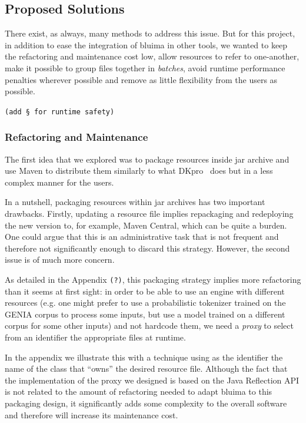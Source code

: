 \documentclass{article}
\newcommand{\TODO}[1]{\texttt{\textcolor{YellowOrange}{(#1)}}} %
\begin{document}
\subsection{Proposed Solutions}

There exist, as always, many methods to address this issue. But for this project, in addition to
ease the integration of bluima in other tools, we wanted to keep the refactoring and maintenance
cost low, allow resources to refer to one-another, make it possible to group files together in
\emph{batches}, avoid runtime performance penalties wherever possible and remove as little
flexibility from the users as possible.

\TODO{add § for runtime safety}

\subsubsection{Refactoring and Maintenance}

The first idea that we explored was to package resources inside jar archive and use Maven to
distribute them similarly to what DKpro~\cite{dkpro} does but in a less complex manner for the
users.

In a nutshell, packaging resources within jar archives has two important drawbacks. Firstly,
updating a resource file implies repackaging and redeploying the new version to, for example, Maven
Central, which can be quite a burden. One could argue that this is an administrative task that is
not frequent and therefore not significantly enough to discard this strategy. However, the second
issue is of much more concern.

As detailed in the Appendix \TODO{?}, this packaging strategy implies more refactoring than it seems
at first sight: in order to be able to use an engine with different resources (e.g. one might prefer
to use a probabilistic tokenizer trained on the GENIA corpus to process some inputs, but use a model
trained on a different corpus for some other inputs) and not hardcode them, we need a \emph{proxy}
to select from an identifier the appropriate files at runtime.

In the appendix we illustrate this with a technique using as the identifier the name of the class
that ``owns'' the desired resource file. Although the fact that the implementation of the proxy we
designed is based on the Java Reflection API is not related to the amount of refactoring needed to
adapt bluima to this packaging design, it significantly adds some complexity to the overall software
and therefore will increase its maintenance cost.
\end{document}
